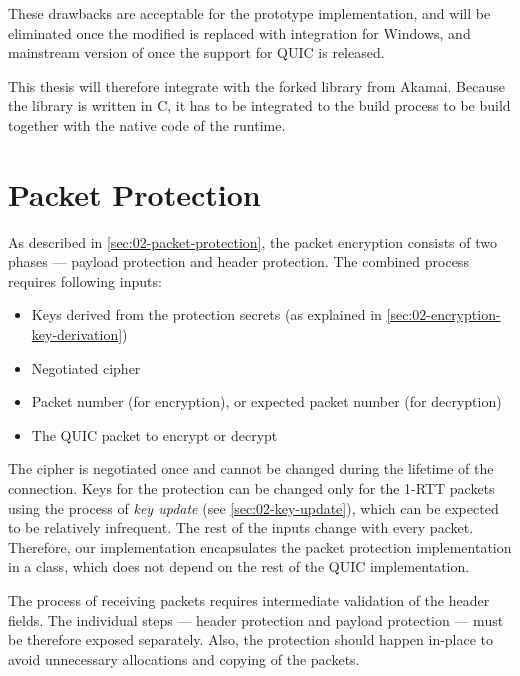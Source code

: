 These drawbacks are acceptable for the prototype implementation, and will be eliminated once the
modified \libopenssl{} is replaced with \libschannel{} integration for Windows, and mainstream
version of \libopenssl{} once the support for QUIC is released.

This thesis will therefore integrate with the forked \libopenssl{} library from Akamai. Because the
library is written in C, it has to be integrated to the build process to be build together with the
native code of the \dotnet{} runtime.

\section{Packet Protection}

As described in \autoref{sec:02-packet-protection}, the packet encryption consists of two phases ---
payload protection and header protection. The combined process requires following inputs:

\begin{itemize}

  \item Keys derived from the protection secrets (as explained in
  \autoref{sec:02-encryption-key-derivation})

  \item Negotiated cipher

  \item Packet number (for encryption), or expected packet number (for decryption)

  \item The QUIC packet to encrypt or decrypt

\end{itemize}

The cipher is negotiated once and cannot be changed during the lifetime of the connection. Keys for
the protection can be changed only for the 1-RTT packets using the process of \textit{key update}
(see \autoref{sec:02-key-update}), which can be expected to be relatively infrequent. The rest of
the inputs change with every packet. Therefore, our implementation encapsulates the packet
protection implementation in a  class, which does not depend on the rest of the
QUIC implementation.

The process of receiving packets requires intermediate validation of the header fields. The
individual steps --- header protection and payload protection --- must be therefore exposed separately.
Also, the protection should happen in-place to avoid unnecessary allocations and copying of the
packets.

